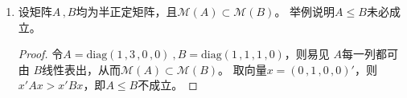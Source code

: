 \documentclass[10pt]{article}
\theoremstyle{definition}
\theoremstyle{definition}
\begin{document}
\begin{enumerate}
\begin{proof}
\begin{enumerate}[label=(\roman*)]
\begin{equation*}
\begin{aligned}
                             & \quad \Rightarrow (A^{\frac{1}{2}}x)'(A^{\frac{1}{2}}x)=0 \\
                             & \quad \Rightarrow (A^{\frac{1}{2}}x)=0 \\
                             & \quad \Rightarrow Ax=0 \\
                             & \quad \Rightarrow \mathcal{M}(B)^{\perp} \subset \mathcal{M}(A)^{\perp} \\
                    \end{aligned}
                \end{equation*}
                从而$\mathcal{M}(A)\subset \mathcal{M}(B)$。
            \item
                对$\forall \xi \in \mathbb{R}^m$，存在$\xi_1\in \mathcal{M}(A)$和$\xi_2\in \mathcal{M}(A)^{\perp}$使得$\xi=\xi_1+\xi_2$。
                从而
                \begin{equation*}
                    \xi' P_A\xi= \xi' P_AP_A\xi=(P_A\xi)'(P_A\xi)=\xi_1'\xi_1
                \end{equation*}
                于是
                \begin{equation*}
                    \begin{aligned}
                        \xi'P_B\xi & = \xi_1'P_B\xi_1 + \xi_1'P_B\xi_2 +\xi_2'P_B\xi_1 + \xi_2'P_B\xi_2 \\
                                   & = (P_B\xi)'(P_B\xi) + (P_B\xi_1)'\xi_2 + \xi_2'(P_B\xi_1) + \xi_2'P_B\xi_2 \\
                                   & = \xi_1'\xi_1 + \xi_1‘’\xi_2 + \xi_2'\xi_1 + \xi_2'P_B\xi_2 \\
                                   & = \xi_1'\xi_1 + \xi_2'P_B\xi_2 \\
                                   & \ge \xi_1'\xi_1 =\xi' P_A\xi
                    \end{aligned}
                \end{equation*}
                从而$P_A \le P_B$。
        \end{enumerate}
    \end{proof}

\item	%
    设矩阵$A\, ,B$均为半正定矩阵，且$\mathcal{M}(A)\subset \mathcal{M}(B)$。
    举例说明$A\le B$未必成立。

    \begin{proof}
        令$A=\mathrm{diag}(1\, ,3\, ,0\, ,0)\ ,B=\mathrm{diag}(1\, ,1\, ,1\, ,0)$，则易见 $A$每一列都可由 $B$线性表出，从而$\mathcal{M}(A)\subset \mathcal{M}(B)$。
        取向量$x=(0\, ,1\, ,0\, ,0)'$，则 $x'Ax>x'Bx$，即$A\le B$不成立。
    \end{proof}
\end{enumerate}
\end{document}
